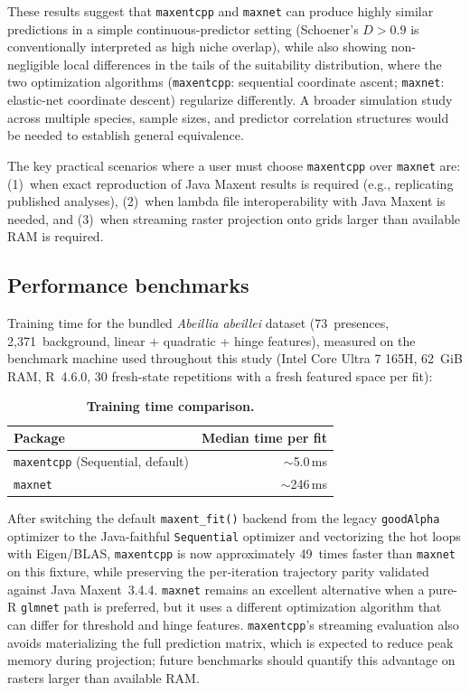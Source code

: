 \documentclass[10pt,letterpaper]{article}
\begin{document}
These results suggest that \texttt{maxentcpp} and \texttt{maxnet}
can produce highly similar predictions in a simple continuous-predictor
setting (Schoener's $D > 0.9$ is conventionally interpreted as high
niche overlap), while also showing non-negligible local differences in
the tails of the suitability distribution, where the two optimization
algorithms (\texttt{maxentcpp}: sequential coordinate ascent;
\texttt{maxnet}: elastic-net coordinate descent) regularize differently.
A broader simulation study across multiple species, sample sizes, and
predictor correlation structures would be needed to establish general
equivalence.

The key practical scenarios where a user must choose \texttt{maxentcpp}
over \texttt{maxnet} are:
(1)~when exact reproduction of Java Maxent results is required
(e.g., replicating published analyses),
(2)~when lambda file interoperability with Java Maxent is needed, and
(3)~when streaming raster projection onto grids larger than available
RAM is required.

\subsection*{Performance benchmarks}

Training time for the bundled \emph{Abeillia abeillei} dataset
(73~presences, 2,371~background, linear + quadratic + hinge features),
measured on the benchmark machine used throughout this study (Intel
Core Ultra 7 165H, 62~GiB RAM, R~4.6.0, 30 fresh-state repetitions with
a fresh featured space per fit):

\begin{table}[!ht]
\centering
\caption{{\bf Training time comparison.}}
\begin{tabular}{|l|r|}
\hline
\textbf{Package} & \textbf{Median time per fit} \\
\hline
\texttt{maxentcpp} (Sequential, default) & $\sim$5.0\,ms \\
\hline
\texttt{maxnet}                            & $\sim$246\,ms \\
\hline
\end{tabular}
\label{tab:benchmark}
\end{table}

After switching the default \texttt{maxent\_fit()} backend from the legacy
\texttt{goodAlpha} optimizer to the Java-faithful \texttt{Sequential}
optimizer and vectorizing the hot loops with Eigen/BLAS,
\texttt{maxentcpp} is now approximately 49~times faster than
\texttt{maxnet} on this fixture, while preserving the per-iteration
trajectory parity validated against Java Maxent~3.4.4.
\texttt{maxnet} remains an excellent alternative when a pure-R
\texttt{glmnet} path is preferred, but it uses a different optimization
algorithm that can differ for threshold and hinge features.
\texttt{maxentcpp}'s streaming evaluation also avoids materializing the
full prediction matrix, which is expected to reduce peak memory during
projection; future benchmarks should quantify this advantage on rasters
larger than available RAM.
\end{document}
